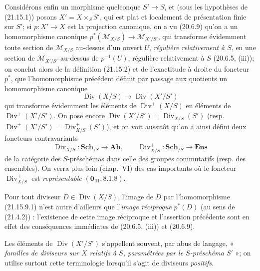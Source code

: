 \begin{env}[21.15.9]
\label{IV.21.15.9}
Considérons enfin un morphisme quelconque $S'\to S$, et (sous les hypothèses de
(21.15.1)) posons $X'=X\times_S S'$, qui est plat et localement de présentation finie
sur $S'$; si $p:X'\to X$ est la projection canonique, on a vu (20.6.9) qu'on a un
homomorphisme canonique
$p^*(\mathscr M_{X/S})\to\mathscr M_{X'/S'}$, qui transforme évidemment toute
section de $\mathscr M_{X/S}$ au-dessus d'un ouvert $U$, \emph{régulière relativement
à $S$}, en une section de $\mathscr M_{X'/S'}$ au-dessus de $p^{-1}(U)$, régulière
relativement à $S$ (20.6.5, (iii)); on conclut alors de la
définition (21.15.2) et de l'exactitude à droite du foncteur $p^*$, que
l'homomorphisme précédent définit par passage aux quotients un homomorphisme canonique
\[
\label{IV.21.15.9.1}
  \operatorname{Div}(X/S)\longrightarrow\operatorname{Div}(X'/S')
  \tag{21.15.9.1}
\]
qui transforme évidemment les éléments de $\operatorname{Div}^+(X/S)$ en éléments de
$\operatorname{Div}^+(X'/S')$. On pose encore
$\operatorname{Div}(X'/S')=\operatorname{Div}_{X/S}(S')$ (resp.
$\operatorname{Div}^+(X'/S')=\operatorname{Div}_{X/S}^+(S')$), et on voit aussitôt
qu'on a ainsi défini deux foncteurs contravariants
\[
  \operatorname{Div}_{X/S}:\mathbf{Sch}_{/S}\longrightarrow\mathbf{Ab},\qquad
  \operatorname{Div}_{X/S}^+:\mathbf{Sch}_{/S}\longrightarrow\mathbf{Ens}
\]
de la catégorie des $S$-préschémas dans celle des groupes commutatifs (resp. des
ensembles). On verra plus loin (chap.~VI) des cas importants où le foncteur
$\operatorname{Div}_{X/S}^+$ est \emph{représentable} $(\mathbf 0_{\mathrm{III}},
8.1.8)$.

Pour tout diviseur $D\in\operatorname{Div}(X/S)$, l'image de $D$ par
l'homomorphisme (21.15.9.1) n'est autre d'ailleurs que l'\emph{image réciproque}
$p^*(D)$ (au sens de (21.4.2)) : l'existence de cette image réciproque et l'assertion
précédente sont en effet des conséquences immédiates de (20.6.5, (iii)) et (20.6.9).

Les éléments de $\operatorname{Div}(X'/S')$ s'appellent souvent, par abus de langage,
« \emph{familles de diviseurs sur $X$ relatifs à $S$, paramétrées par le
$S$-préschéma $S'$} »; on utilise surtout cette terminologie lorsqu'il s'agit de
diviseurs \emph{positifs}.
\end{env}
